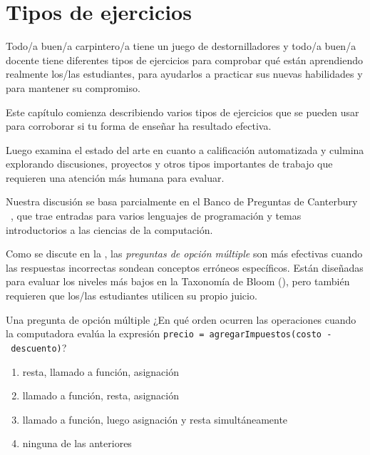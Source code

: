 \chapter{Tipos de ejercicios}\label{s:exercises}

Todo/a buen/a carpintero/a tiene un juego de destornilladores y todo/a buen/a docente tiene diferentes tipos de ejercicios para comprobar qué están aprendiendo realmente los/las estudiantes, para ayudarlos a practicar sus nuevas habilidades y para mantener su compromiso.

Este capítulo comienza describiendo varios tipos de ejercicios que se pueden usar para corroborar si tu forma de enseñar ha resultado efectiva.

Luego examina el estado del arte en cuanto a calificación automatizada y culmina explorando discusiones, proyectos y otros tipos importantes de trabajo que requieren una atención más humana para evaluar.

Nuestra discusión se basa parcialmente en el Banco de Preguntas de Canterbury ~\cite{Sand2013}, que trae entradas para varios lenguajes de programación y temas introductorios a las ciencias de la computación.


Como se discute en la , las \emph{preguntas de opción múltiple} son más efectivas cuando las respuestas incorrectas sondean conceptos erróneos específicos.  
Están diseñadas para evaluar los niveles más bajos en la Taxonomía de Bloom 
(), pero también requieren que los/las estudiantes utilicen su propio juicio.

\begin{aside}{Una pregunta de opción múltiple}
  ¿En qué orden ocurren las operaciones cuando la computadora evalúa la expresión \texttt{precio\ =\ agregarImpuestos(costo\ -\ descuento)}?
  \begin{enumerate}
  \item
    resta, llamado a función, asignación
  \item
    llamado a función, resta, asignación
  \item
    llamado a función, luego asignación y resta simultáneamente
  \item
    ninguna de las anteriores
  \end{enumerate}
\end{aside}


